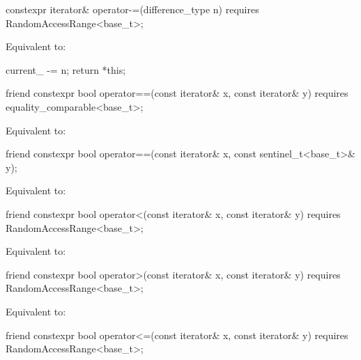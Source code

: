 \begin{itemdecl}
constexpr iterator& operator-=(difference_type n)
  requires RandomAccessRange<base_t>;
\end{itemdecl}

\begin{itemdescr}
\pnum
\effects
Equivalent to:
\begin{codeblock}
current_ -= n;
return *this;
\end{codeblock}
\end{itemdescr}

\begin{itemdecl}
friend constexpr bool operator==(const iterator& x, const iterator& y)
  requires equality_comparable<base_t>;
\end{itemdecl}

\begin{itemdescr}
\pnum
\effects
Equivalent to: 
\end{itemdescr}

\begin{itemdecl}
friend constexpr bool operator==(const iterator& x, const sentinel_t<base_t>& y);
\end{itemdecl}

\begin{itemdescr}
\pnum
\effects
Equivalent to: 
\end{itemdescr}

\begin{itemdecl}
friend constexpr bool operator<(const iterator& x, const iterator& y)
  requires RandomAccessRange<base_t>;
\end{itemdecl}

\begin{itemdescr}
\pnum
\effects
Equivalent to: 
\end{itemdescr}

\begin{itemdecl}
friend constexpr bool operator>(const iterator& x, const iterator& y)
  requires RandomAccessRange<base_t>;
\end{itemdecl}

\begin{itemdescr}
\pnum
\effects
Equivalent to: 
\end{itemdescr}

\begin{itemdecl}
friend constexpr bool operator<=(const iterator& x, const iterator& y)
  requires RandomAccessRange<base_t>;
\end{itemdecl}

